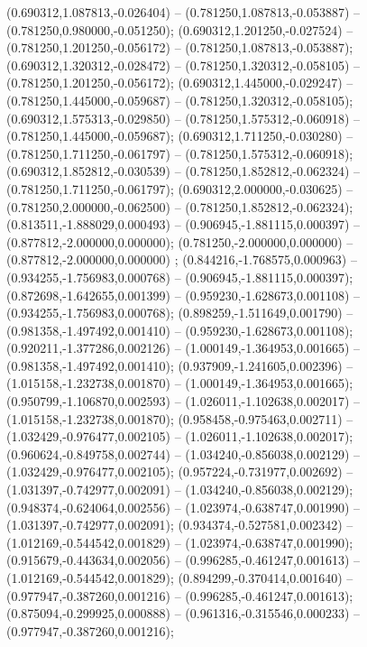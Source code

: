  (0.690312,1.087813,-0.026404) -- (0.781250,1.087813,-0.053887) -- (0.781250,0.980000,-0.051250);
 (0.690312,1.201250,-0.027524) -- (0.781250,1.201250,-0.056172) -- (0.781250,1.087813,-0.053887);
 (0.690312,1.320312,-0.028472) -- (0.781250,1.320312,-0.058105) -- (0.781250,1.201250,-0.056172);
 (0.690312,1.445000,-0.029247) -- (0.781250,1.445000,-0.059687) -- (0.781250,1.320312,-0.058105);
 (0.690312,1.575313,-0.029850) -- (0.781250,1.575312,-0.060918) -- (0.781250,1.445000,-0.059687);
 (0.690312,1.711250,-0.030280) -- (0.781250,1.711250,-0.061797) -- (0.781250,1.575312,-0.060918);
 (0.690312,1.852812,-0.030539) -- (0.781250,1.852812,-0.062324) -- (0.781250,1.711250,-0.061797);
 (0.690312,2.000000,-0.030625) -- (0.781250,2.000000,-0.062500) -- (0.781250,1.852812,-0.062324);
 (0.813511,-1.888029,0.000493) -- (0.906945,-1.881115,0.000397) -- (0.877812,-2.000000,0.000000);
 (0.781250,-2.000000,0.000000) -- (0.877812,-2.000000,0.000000) ;
 (0.844216,-1.768575,0.000963) -- (0.934255,-1.756983,0.000768) -- (0.906945,-1.881115,0.000397);
 (0.872698,-1.642655,0.001399) -- (0.959230,-1.628673,0.001108) -- (0.934255,-1.756983,0.000768);
 (0.898259,-1.511649,0.001790) -- (0.981358,-1.497492,0.001410) -- (0.959230,-1.628673,0.001108);
 (0.920211,-1.377286,0.002126) -- (1.000149,-1.364953,0.001665) -- (0.981358,-1.497492,0.001410);
 (0.937909,-1.241605,0.002396) -- (1.015158,-1.232738,0.001870) -- (1.000149,-1.364953,0.001665);
 (0.950799,-1.106870,0.002593) -- (1.026011,-1.102638,0.002017) -- (1.015158,-1.232738,0.001870);
 (0.958458,-0.975463,0.002711) -- (1.032429,-0.976477,0.002105) -- (1.026011,-1.102638,0.002017);
 (0.960624,-0.849758,0.002744) -- (1.034240,-0.856038,0.002129) -- (1.032429,-0.976477,0.002105);
 (0.957224,-0.731977,0.002692) -- (1.031397,-0.742977,0.002091) -- (1.034240,-0.856038,0.002129);
 (0.948374,-0.624064,0.002556) -- (1.023974,-0.638747,0.001990) -- (1.031397,-0.742977,0.002091);
 (0.934374,-0.527581,0.002342) -- (1.012169,-0.544542,0.001829) -- (1.023974,-0.638747,0.001990);
 (0.915679,-0.443634,0.002056) -- (0.996285,-0.461247,0.001613) -- (1.012169,-0.544542,0.001829);
 (0.894299,-0.370414,0.001640) -- (0.977947,-0.387260,0.001216) -- (0.996285,-0.461247,0.001613);
 (0.875094,-0.299925,0.000888) -- (0.961316,-0.315546,0.000233) -- (0.977947,-0.387260,0.001216);
